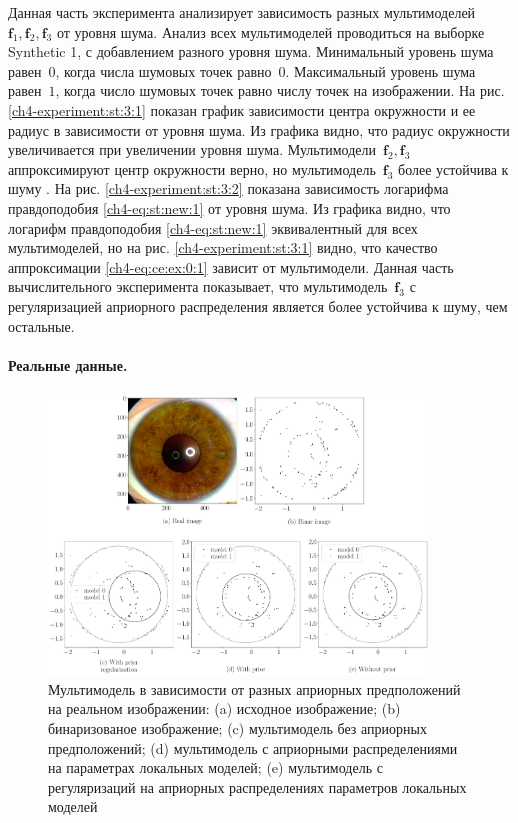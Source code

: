 Данная часть эксперимента анализирует зависимость разных мультимоделей~$\textbf{f}_1, \textbf{f}_2, \textbf{f}_3$ от уровня шума. 
Анализ всех мультимоделей проводиться на выборке Synthetic 1, с добавлением разного уровня шума.
Минимальный уровень шума равен~$0$, когда числа шумовых точек равно~$0$. Максимальный уровень шума равен~$1$, когда число шумовых точек равно числу точек на изображении.
На рис. \ref{ch4-experiment:st:3:1} показан график зависимости центра окружности и ее радиус в зависимости от уровня шума. Из графика видно, что радиус окружности увеличивается при увеличении уровня шума. 
Мультимодели~$\textbf{f}_2, \textbf{f}_3$ аппроксимируют центр окружности верно, но мультимодель~$\textbf{f}_3$ более устойчива к шуму .
На рис. \ref{ch4-experiment:st:3:2} показана зависимость логарифма правдоподобия \eqref{ch4-eq:st:new:1} от уровня шума. 
Из графика видно, что логарифм правдоподобия \eqref{ch4-eq:st:new:1} эквивалентный для всех мультимоделей, но на рис. \ref{ch4-experiment:st:3:1} видно, что качество аппроксимации \eqref{ch4-eq:ce:ex:0:1} зависит от мультимодели.
Данная часть вычислительного эксперимента показывает, что мультимодель~$\textbf{f}_3$ с регуляризацией априорного распределения является более устойчива к шуму, чем остальные.

\paragraph{Реальные данные.}
\begin{figure}[!ht]\center
\includegraphics[width=0.9\textwidth]{results/priorexpert/experiment_real_compare}
\caption{Мультимодель в зависимости от разных априорных предположений на реальном изображении: (a) исходное изображение; (b) бинаризованое изображение; (c) мультимодель без априорных предположений; (d) мультимодель с априорными распределениями на параметрах локальных моделей; (e) мультимодель с регуляризаций на априорных распределениях параметров локальных моделей}
\label{ch4-experiment:2}
\end{figure}

